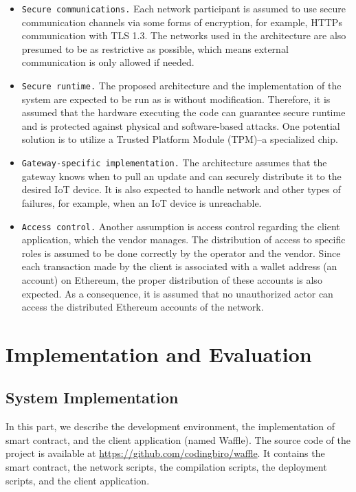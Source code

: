 \documentclass[conference]{IEEEtran}
\begin{document}
\begin{itemize}
\item \texttt{Secure communications.} Each network participant is assumed to use secure communication channels via some forms of encryption, for example, HTTPs communication with TLS 1.3. The networks used in the architecture are also presumed to be as restrictive as possible, which means external communication is only allowed if needed.

\item \texttt{Secure runtime.} The proposed architecture and the implementation of the system are expected to be run as is without modification. Therefore, it is assumed that the hardware executing the code can guarantee secure runtime and is protected against physical and software-based attacks. One potential solution is to utilize a Trusted Platform Module (TPM)--a specialized chip. %

\item \texttt{Gateway-specific implementation.} The architecture assumes that the gateway knows when to pull an update and can securely distribute it to the desired IoT device. It is also expected to handle network and other types of failures, for example, when an IoT device is unreachable.

\item \texttt{Access control.} Another assumption is access control regarding the client application, which the vendor manages. The distribution of access to specific roles is assumed to be done correctly by the operator and the vendor. Since each transaction made by the client is associated with a wallet address (an account) on Ethereum, the proper distribution of these accounts is also expected. As a consequence, it is assumed that no unauthorized actor can access the distributed Ethereum accounts of the network.
\end{itemize}

\section{Implementation and Evaluation} \label{sec:4}

\subsection{System Implementation}
In this part, we describe the development environment, the implementation of smart contract, and the client application (named Waffle).
The source code of the project is available at \url{https://github.com/codingbiro/waffle}. It contains the smart contract, the network scripts, the compilation scripts, the deployment scripts, and the client application.
\end{document}
